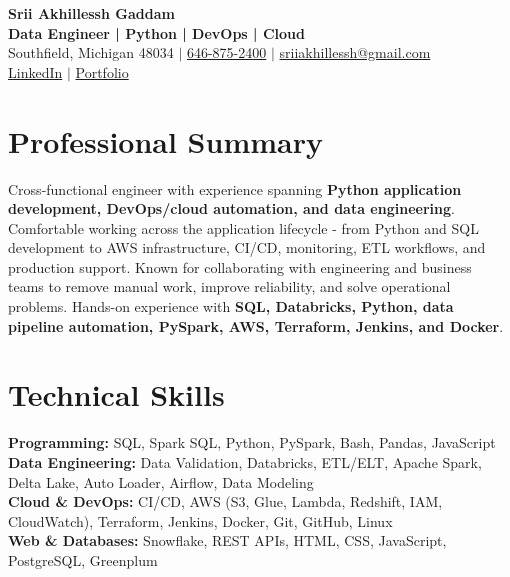 \documentclass[letterpaper,10pt]{article}
\begin{document}
\fontsize{9.35pt}{10.45pt}\selectfont

\begin{center}
    {\LARGE \textbf{Srii Akhillessh Gaddam}} \\[-1pt]
    \textbf{Data Engineer | Python | DevOps | Cloud} \\[2pt]
    Southfield, Michigan 48034 $|$
    \href{tel:6468752400}{646-875-2400} $|$
    \href{mailto:sriiakhillessh@gmail.com}{sriiakhillessh@gmail.com} \\[1pt]
    \href{https://www.linkedin.com/in/srii-akhiilessh-gaddam-b48668191/}{LinkedIn} $|$
    \href{https://sriiakhillesshg.github.io/portfolio/}{Portfolio}
\end{center}
\vspace{-8pt}

\section{Professional Summary}
\small{Cross-functional engineer with experience spanning \textbf{Python application development, DevOps/cloud automation, and data engineering}. Comfortable working across the application lifecycle - from Python and SQL development to AWS infrastructure, CI/CD, monitoring, ETL workflows, and production support. Known for collaborating with engineering and business teams to remove manual work, improve reliability, and solve operational problems. Hands-on experience with \textbf{SQL, Databricks, Python, data pipeline automation, PySpark, AWS, Terraform, Jenkins, and Docker}.}

\section{Technical Skills}
\small{
\textbf{Programming:} SQL, Spark SQL, Python, PySpark, Bash, Pandas, JavaScript \\
\textbf{Data Engineering:} Data Validation, Databricks, ETL/ELT, Apache Spark, Delta Lake, Auto Loader, Airflow, Data Modeling \\
\textbf{Cloud \& DevOps:} CI/CD, AWS (S3, Glue, Lambda, Redshift, IAM, CloudWatch), Terraform, Jenkins, Docker, Git, GitHub, Linux \\
\textbf{Web \& Databases:} Snowflake, REST APIs, HTML, CSS, JavaScript, PostgreSQL, Greenplum
}

\end{document}
